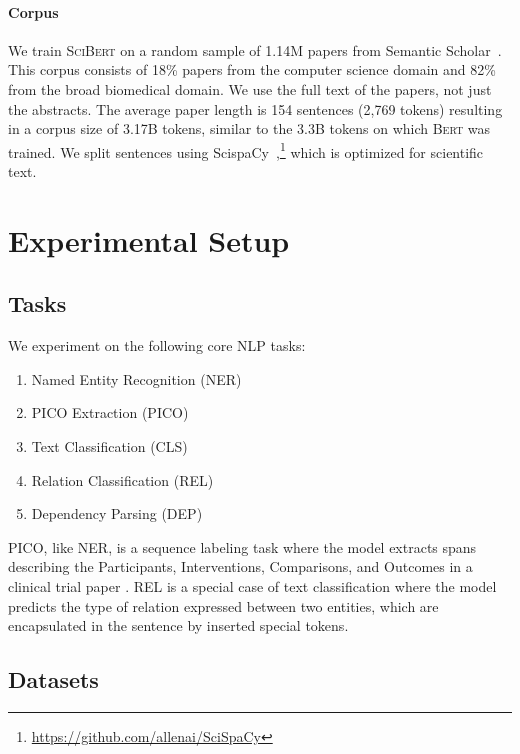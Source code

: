 \documentclass[11pt,a4paper]{article}
\newcommand{\bert}{\textsc{Bert}\xspace}
\newcommand{\scibert}{\textsc{SciBert}\xspace}
\begin{document}
\paragraph{Corpus}
We train \scibert on a random sample of 1.14M papers from
Semantic Scholar~\cite{ammar:18}. 
This corpus consists of 18\% papers from 
the computer science domain and 82\% from the broad biomedical domain. 
We use the full text of the papers, not just the abstracts.
The average paper length is 154 sentences (2,769 tokens) 
resulting in a corpus size of 3.17B tokens, similar to the 3.3B tokens on which \bert was trained. We split sentences using ScispaCy~\cite{Neumann2019},\footnote{\url{https://github.com/allenai/SciSpaCy}} which is optimized for scientific text. 


 
\section{Experimental Setup}


 
 
 
\subsection{Tasks}

We experiment on the following core NLP tasks: 
\begin{enumerate}
  \setlength{\itemsep}{0pt}
  \setlength{\parskip}{0pt}
    \item Named Entity Recognition (NER)
    \item PICO Extraction (PICO)
    \item Text Classification (CLS)
    \item Relation Classification (REL)
    \item Dependency Parsing (DEP)
\end{enumerate}
PICO, like NER, is a sequence labeling task where the model extracts spans describing the Participants, Interventions, Comparisons, and Outcomes in a clinical trial paper \cite{Kim2011AutomaticCO}.  REL is a special case of text classification where the model predicts the type of relation expressed between two entities, which are encapsulated in the sentence by inserted special tokens.




 


\subsection{Datasets}
\end{document}
